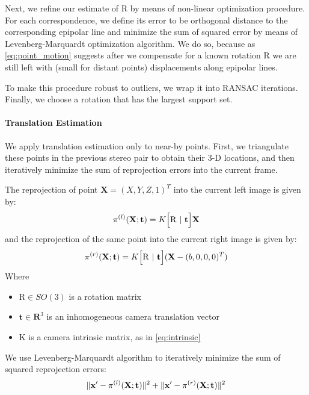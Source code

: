 \documentclass[runningheads]{llncs}
\DeclarePairedDelimiter{\norm}{\lVert}{\rVert}
\begin{document}
Next, we refine our estimate of $\mathrm{R}$ by means of non-linear
optimization procedure.  For each correspondence, we define its error
to be orthogonal distance to the corresponding epipolar line and
minimize the sum of squared error by means of Levenberg-Marquardt
optimization algorithm. We do so, because as \ref{eq:point_motion}
suggests after we compensate for a known rotation $\mathrm{R}$ we are
still left with (small for distant points) displacements along
epipolar lines.

To make this procedure robust to outliers, we wrap it into RANSAC
iterations.  Finally, we choose a rotation that has the largest
support set.

\paragraph{Translation Estimation} We apply translation estimation
only to near-by points.  First, we triangulate these points in the
previous stereo pair to obtain their 3-D locations, and then
iteratively minimize the sum of reprojection errors into the current
frame.

The reprojection of point $\mathbf{X}=(X,Y,Z,1)^T$ into the current
left image is given by:
\begin{equation}
  \pi^{(l)}(\mathbf{X};\mathbf{t}) =  K\Bigl[ \mathrm{R}\ |\ \mathbf{t} \Bigr]\mathbf{X} 
\end{equation}
and the reprojection of the same point into the current right image is
given by:
\begin{equation}
  \pi^{(r)}(\mathbf{X};\mathbf{t}) =  K\Bigl[ \mathrm{R}\ |\ \mathbf{t} \Bigr](\mathbf{X} - (b,0,0,0)^T)
\end{equation}
Where 
\begin{itemize}
\item $\mathrm{R}\in SO(3)$ is a rotation matrix
\item $\mathbf{t}\in \mathbf{R}^3$ is an inhomogeneous camera translation vector
\item $\mathrm{K}$ is a camera intrinsic matrix, as in \ref{eq:intrinsic}
\end{itemize}

We use Levenberg-Marquardt algorithm to iteratively minimize the sum
of squared reprojection errors:
\begin{equation}
\norm{\mathbf{x'} - \pi^{(l)}(\mathbf{X};\mathbf{t})}^2 + \norm{\mathbf{x'} - \pi^{(r)}(\mathbf{X};\mathbf{t})}^2
\end{equation}
\end{document}
